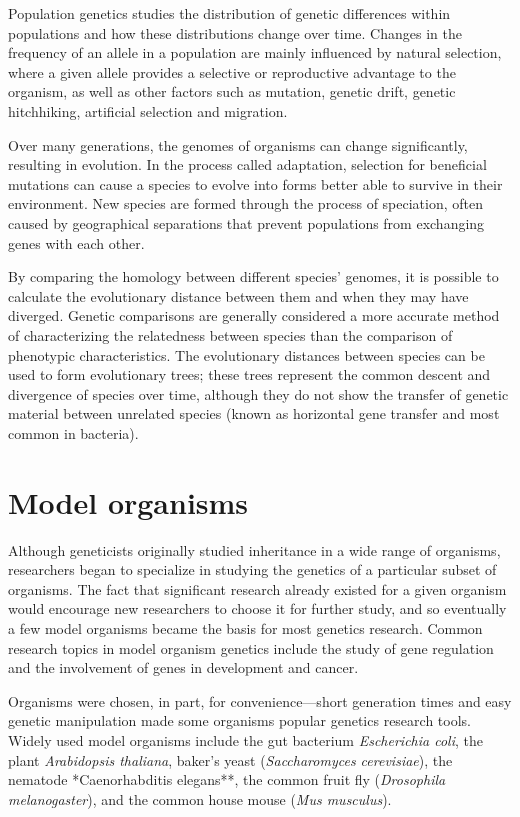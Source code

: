 Population genetics studies the distribution of genetic differences within populations and how these distributions change over time. Changes in the frequency of an allele in a population are mainly influenced by natural selection, where a given allele provides a selective or reproductive advantage to the organism, as well as other factors such as mutation, genetic drift, genetic hitchhiking, artificial selection and migration.

Over many generations, the genomes of organisms can change significantly, resulting in evolution. In the process called adaptation, selection for beneficial mutations can cause a species to evolve into forms better able to survive in their environment. New species are formed through the process of speciation, often caused by geographical separations that prevent populations from exchanging genes with each other.

By comparing the homology between different species' genomes, it is possible to calculate the evolutionary distance between them and when they may have diverged. Genetic comparisons are generally considered a more accurate method of characterizing the relatedness between species than the comparison of phenotypic characteristics. The evolutionary distances between species can be used to form evolutionary trees; these trees represent the common descent and divergence of species over time, although they do not show the transfer of genetic material between unrelated species (known as horizontal gene transfer and most common in bacteria).

\hypertarget{model-organisms}{%
\section{Model organisms}\label{model-organisms}}

Although geneticists originally studied inheritance in a wide range of organisms, researchers began to specialize in studying the genetics of a particular subset of organisms. The fact that significant research already existed for a given organism would encourage new researchers to choose it for further study, and so eventually a few model organisms became the basis for most genetics research. Common research topics in model organism genetics include the study of gene regulation and the involvement of genes in development and cancer.

Organisms were chosen, in part, for convenience---short generation times and easy genetic manipulation made some organisms popular genetics research tools. Widely used model organisms include the gut bacterium \emph{Escherichia coli}, the plant \emph{Arabidopsis thaliana}, baker's yeast (\emph{Saccharomyces cerevisiae}), the nematode *Caenorhabditis elegans**, the common fruit fly (\emph{Drosophila melanogaster}), and the common house mouse (\emph{Mus musculus}).

